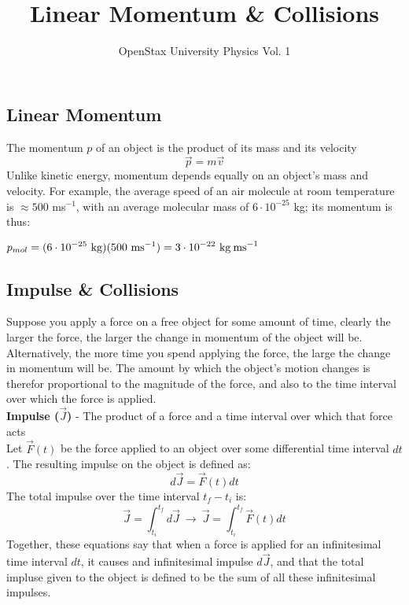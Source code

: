 \documentclass[a4paper]{article}
\title{Linear Momentum \& Collisions}
\author{OpenStax University Physics Vol. 1}
\let\bf\textbf
\begin{document}
\setcounter{section}{9}
\maketitle
\subsection{Linear Momentum}
The momentum $p$ of an object is the product of its mass and its velocity
\begin{equation}
    \displaystyle \vec{p} = m\vec{v}
\end{equation}
Unlike kinetic energy, momentum depends equally on an object's mass and velocity. For example, the average speed of an air molecule at room temperature is $\approx 500$ ms$^{-1}$, with an average molecular mass of $6 \cdot 10^{-25}$ kg; its momentum is thus:
\begin{center}
    $\displaystyle p_{mol} = (6\cdot 10^{-25}\text{ kg})(500\text{ ms}^{-1}) = 3 \cdot 10^{-22} \text{ kg\:ms}^{-1}$
\end{center}

\subsection{Impulse \& Collisions}
Suppose you apply a force on a free object for some amount of time, clearly the larger the force, the larger the change in momentum of the object will be. Alternatively, the more time you spend applying the force, the large the change in momentum will be. The amount by which the object's motion changes is therefor proportional to the magnitude of the force, and also to the time interval over which the force is applied.
\vspace{2mm}\\
\bf{Impulse ($\vec{J}$)} - The product of a force and a time interval over which that force acts
\vspace{1mm}\\
Let $\vec{F}(t)$ be the force applied to an object over some differential time interval $dt$. The resulting impulse on the object is defined as:
\begin{equation}
    d\vec{J} = \vec{F}(t)dt
\end{equation}
The total impulse over the time interval $t_f - t_i$ is:
\begin{equation}
    \vec{J} = \int_{t_i}^{t_f}d\vec{J} \ \boldsymbol{\to} \ \vec{J} = \int_{t_i}^{t_f}\vec{F}(t)dt
\end{equation}
Together, these equations say that when a force is applied for an infinitesimal time interval $dt$, it causes and infinitesimal impulse $d\vec{J}$, and that the total impluse given to the object is defined to be the sum of all these infinitesimal impulses.
\end{document}
